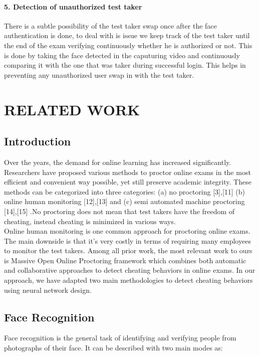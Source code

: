 \documentclass[12pt]{report}
\begin{document}
\subsubsection{5. Detection of unauthorized test taker}
There is a subtle possibility of the test taker swap once after the face authentication is done, to deal with is issue we keep track of the test taker until the end of the exam verifying continuously whether he is authorized or not. This is done by taking the face detected in the caputuring video and continuously comparing it with the one that was taker during successful login. This helps in preventing any unauthorized user swap in with the test taker.
\chapter{RELATED WORK}

\section{Introduction}
Over the years, the demand for online learning has increased significantly. Researchers have proposed various methods to proctor online exams in the most efficient and convenient way possible, yet still preserve academic integrity. These methods can be categorized into three categories: (a) no proctoring [3],[11] (b) online human monitoring [12],[13] and (c) semi automated machine proctoring [14],[15] .No proctoring does not mean that test takers have the freedom of cheating, instead cheating is minimized in various ways.\\

Online human monitoring is one common approach for proctoring online exams. The main downside is that it’s very costly in terms of requiring many employees to monitor the test takers. Among all prior work, the most relevant work to ours is Massive Open Online Proctoring framework  which combines both automatic and collaborative approaches to detect cheating behaviors in online exams. In our approach, we have adapted two main methodologies to detect cheating behaviors using neural network design.

\section{Face Recognition}

Face recognition is the general task of identifying and verifying people from photographs of their face. It can be described with two main modes as:\\
\end{document}
